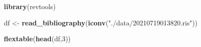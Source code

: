 \documentclass[
]{book}
\newenvironment{Shaded}{\begin{snugshade}}{\end{snugshade}}
\newcommand{\DecValTok}[1]{\textcolor[rgb]{0.00,0.00,0.81}{#1}}
\newcommand{\KeywordTok}[1]{\textcolor[rgb]{0.13,0.29,0.53}{\textbf{#1}}}
\newcommand{\NormalTok}[1]{#1}
\newcommand{\StringTok}[1]{\textcolor[rgb]{0.31,0.60,0.02}{#1}}
\begin{document}
\begin{Shaded}
\begin{Highlighting}[]
\KeywordTok{library}\NormalTok{(revtools)}


\NormalTok{df <-}\StringTok{ }\KeywordTok{read_bibliography}\NormalTok{(}\KeywordTok{iconv}\NormalTok{(}\StringTok{"./data/20210719013820.ris"}\NormalTok{))}

\KeywordTok{flextable}\NormalTok{(}\KeywordTok{head}\NormalTok{(df,}\DecValTok{3}\NormalTok{))}
\end{Highlighting}
\end{Shaded}

\providecommand{\docline}[3]{\noalign{\global\setlength{\arrayrulewidth}{#1}}\arrayrulecolor[HTML]{#2}\cline{#3}}

\setlength{\tabcolsep}{2pt}

\renewcommand*{\arraystretch}{1.5}
\end{document}
